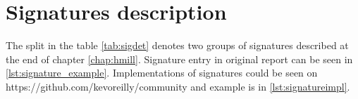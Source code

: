 \chapter{Signatures description} \label{app:signatures}
The split in the table \ref{tab:sigdet} denotes two groups of signatures described at the end of chapter \ref{chap:hmill}.
Signature entry in original report can be seen in \ref{lst:signature_example}. Implementations of signatures could be seen on https://github.com/kevoreilly/community and example is in \ref{lst:signatureimpl}.

\newpage

